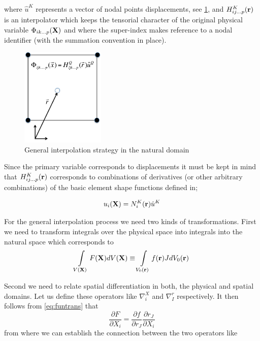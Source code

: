 where $\hat{u}^K$ represents a vector of nodal points displacements, see \cref{fig:interpol nat dom}, and $H_{ij...p}^K(\vb{r})$ is an interpolator which keeps the tensorial character of the original physical variable $\Phi_{ik...p}(\vb{X})$ and where the super-index makes reference to a nodal identifier (with the summation convention in place).


\begin{figure}[h]
\centering
\includegraphics[width=4cm]{figure2.pdf}
\caption{General interpolation strategy in the natural domain}
\label{fig:interpol nat dom}
\end{figure}
 


Since the primary variable corresponds to displacements it must be kept in mind that $H_{ij...p}^K(\vb{r})$ corresponds to combinations of derivatives (or other arbitrary combinations) of the basic element shape functions defined in;


\begin{equation}
u_i(\vb{X})=N_i^K(\vb{r})\hat{u}^K
\label{eq:el interpol}
\end{equation}



For the general interpolation process we need two kinds of transformations.  First we need to transform integrals over the physical space into integrals into the natural space which corresponds to
\begin{equation}
\int\limits_{V(\vb{X})} F(\vb{X})dV(\vb{X})\equiv \int\limits_{V_0(\vb{r})} f(\vb{r})J dV_0(\vb{r})
\label{gen trans}
\end{equation}



Second we need to relate spatial differentiation in both, the physical and spatial domains.  Let us define these operators like $\nabla_i^X$ and $\nabla_I^r$ respectively. It then follows from \cref{eq:funtrans} that
\begin{equation}
\dfrac{\partial F}{\partial X_i}=\dfrac{\partial f}{\partial r_J}\dfrac{\partial r_J}{\partial X_i}
\label{eq:chain}
\end{equation}
from where we can establish the connection between the two operators like


